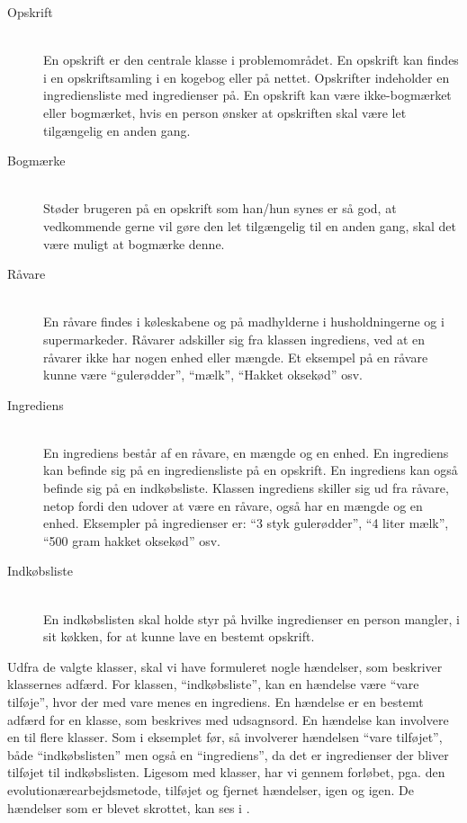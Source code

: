 \begin{description}
\item[Opskrift] \hfill \\
En opskrift er den centrale klasse i problemområdet. En opskrift kan findes i en opskriftsamling i en kogebog eller på nettet. Opskrifter indeholder en ingrediensliste med ingredienser på. En opskrift kan være ikke-bogmærket eller bogmærket, hvis en person ønsker at opskriften skal være let tilgængelig en anden gang.

\item[Bogmærke] \hfill \\
Støder brugeren på en opskrift som han/hun synes er så god, at vedkommende gerne vil gøre den let tilgængelig til en anden gang, skal det være muligt at bogmærke denne. 

\item[Råvare] \hfill \\
En råvare findes i køleskabene og på madhylderne i husholdningerne og i supermarkeder. Råvarer adskiller sig fra klassen ingrediens, ved at en råvarer ikke har nogen enhed eller mængde. Et eksempel på en råvare kunne være ``gulerødder'', ``mælk'', ``Hakket oksekød'' osv. 

\item[Ingrediens] \hfill \\ 
En ingrediens består af en råvare, en mængde og en enhed. En ingrediens kan befinde sig på en ingrediensliste på en opskrift. En ingrediens kan også befinde sig på en indkøbsliste. Klassen ingrediens skiller sig ud fra råvare, netop fordi den udover at være en råvare, også har en mængde og en enhed. Eksempler på ingredienser er: ``3 styk gulerødder'', ``4 liter mælk'', ``500 gram hakket oksekød'' osv.

\item[Indkøbsliste] \hfill \\
En indkøbslisten skal holde styr på hvilke ingredienser en person mangler, i sit køkken, for at kunne lave en bestemt opskrift. 
\end{description}

Udfra de valgte klasser, skal vi have formuleret nogle hændelser, som beskriver klassernes adfærd. For klassen, ``indkøbsliste'', kan en hændelse \fx være ``vare tilføje'', hvor der med vare menes en ingrediens. En hændelse er en bestemt adfærd for en klasse, som beskrives med udsagnsord. En hændelse kan involvere en til flere klasser. Som i eksemplet før, så involverer hændelsen ``vare tilføjet'', både ``indkøbslisten'' men også en ``ingrediens'', da det er ingredienser der bliver tilføjet til indkøbslisten. Ligesom med klasser, har vi gennem forløbet, pga. den evolutionærearbejdsmetode, tilføjet og fjernet hændelser, igen og igen. De hændelser som er blevet skrottet, kan ses i .    

